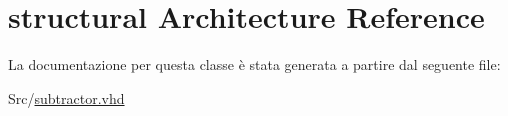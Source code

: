 \hypertarget{classsubtractor_1_1structural}{}\section{structural Architecture Reference}
\label{classsubtractor_1_1structural}


La documentazione per questa classe è stata generata a partire dal seguente file\+:\begin{DoxyCompactItemize}
\item 
Src/\hyperlink{subtractor_8vhd}{subtractor.\+vhd}\end{DoxyCompactItemize}
